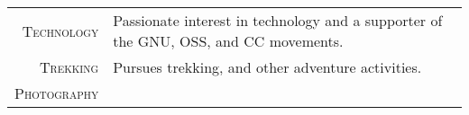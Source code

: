 %
%
%

\begin{tabular}{rl}
    \textsc{Technology} & Passionate interest in technology and a supporter of the GNU, OSS, and CC movements.\\ %
    \textsc{Trekking} & Pursues trekking, and other adventure activities.\\ 
    \textsc{Photography} & \\
\end{tabular}